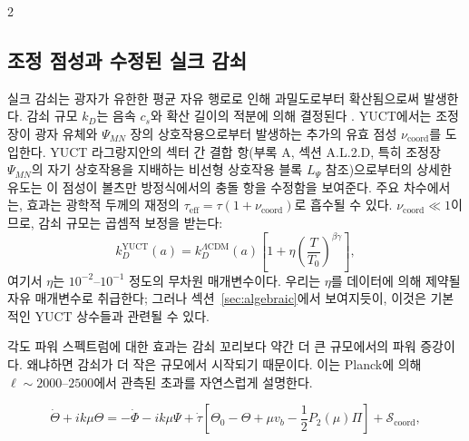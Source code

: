 \documentclass[11pt,a4paper]{article}
\begin{document}
\begin{multicols}{2}
		\subsection{조정 점성과 수정된 실크 감쇠}
		
		실크 감쇠는 광자가 유한한 평균 자유 행로로 인해 과밀도로부터 확산됨으로써 발생한다. 감쇠 규모 $k_D$는 음속 $c_s$와 확산 길이의 적분에 의해 결정된다 \cite{Silk1968}. YUCT에서는 조정장이 광자 유체와 $\Psi_{MN}$ 장의 상호작용으로부터 발생하는 추가의 유효 점성 $\nu_{\mathrm{coord}}$를 도입한다. YUCT 라그랑지안의 섹터 간 결합 항(부록 A, 섹션 A.L.2.D, 특히 조정장 $\Psi_{MN}$의 자기 상호작용을 지배하는 비선형 상호작용 블록 $L_{\Psi}$ 참조)으로부터의 상세한 유도는 이 점성이 볼츠만 방정식에서의 충돌 항을 수정함을 보여준다. 주요 차수에서는, 효과는 광학적 두께의 재정의 $\tau_{\mathrm{eff}} = \tau (1 + \nu_{\mathrm{coord}})$로 흡수될 수 있다. $\nu_{\mathrm{coord}} \ll 1$이므로, 감쇠 규모는 곱셈적 보정을 받는다:
		\begin{equation}
			k_D^{\text{YUCT}}(a) = k_D^{\Lambda\text{CDM}}(a) \left[1 + \eta \left(\frac{T}{T_0}\right)^{\beta\gamma}\right],
			\label{eq:kD}
		\end{equation}
		여기서 $\eta$는 $10^{-2}$--$10^{-1}$ 정도의 무차원 매개변수이다. 우리는 $\eta$를 데이터에 의해 제약될 자유 매개변수로 취급한다; 그러나 섹션~\ref{sec:algebraic}에서 보여지듯이, 이것은 기본적인 YUCT 상수들과 관련될 수 있다.
		
		각도 파워 스펙트럼에 대한 효과는 감쇠 꼬리보다 약간 더 큰 규모에서의 파워 증강이다. 왜냐하면 감쇠가 더 작은 규모에서 시작되기 때문이다. 이는 Planck에 의해 $\ell \sim 2000$--$2500$에서 관측된 초과를 자연스럽게 설명한다.
		
	\end{multicols}
	
	\begin{equation}
		\dot{\Theta} + ik\mu\Theta = -\dot{\Phi} - ik\mu\Psi + \dot{\tau}\left[\Theta_0 - \Theta + \mu v_b - \frac{1}{2}P_2(\mu)\Pi\right] + \mathcal{S}_{\mathrm{coord}},
		\label{eq:boltzmann}
	\end{equation}
	
\end{document}
